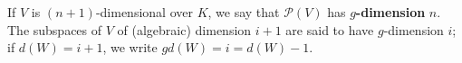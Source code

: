 If $V$ is $(n+1)$-dimensional over $K$, we say that $\mathcal{P}(V)$ has \textbf{$g$-dimension} $n$. The subspaces of $V$ of (algebraic) dimension $i+1$ are said to have $g$-dimension $i$; if $d(W)=i+1$, we write $gd(W)=i=d(W)-1$.
